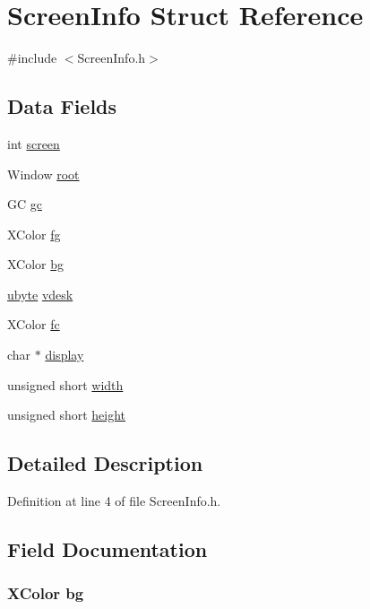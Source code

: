 \hypertarget{struct_screen_info}{
\section{ScreenInfo Struct Reference}
\label{struct_screen_info}
}


{\ttfamily \#include $<$ScreenInfo.h$>$}

\subsection*{Data Fields}
\begin{DoxyCompactItemize}
\item 
int \hyperlink{struct_screen_info_a3109b0889cec9f0de874a2bdc1f84372}{screen}
\item 
Window \hyperlink{struct_screen_info_a67efd2aa4387dcb1b33df1f044512a16}{root}
\item 
GC \hyperlink{struct_screen_info_a5da9d24666f1955a9b5ce3d2583b823a}{gc}
\item 
XColor \hyperlink{struct_screen_info_aed0a28efb15ae5e30e0891b8af03b81f}{fg}
\item 
XColor \hyperlink{struct_screen_info_aed6074a680f9192c5fec0db4ba505bd4}{bg}
\item 
\hyperlink{arwm_8h_a5dd4f281954ce1405c92d62a427f839a}{ubyte} \hyperlink{struct_screen_info_ac261b53c2ef43b8fb701497822972797}{vdesk}
\item 
XColor \hyperlink{struct_screen_info_a1c33682701113f93a154f659078b1940}{fc}
\item 
char $\ast$ \hyperlink{struct_screen_info_ac49dfab9200d48f835ce64819c4fc878}{display}
\item 
unsigned short \hyperlink{struct_screen_info_a8a31e3e5c2765d45488c75c00bacfefd}{width}
\item 
unsigned short \hyperlink{struct_screen_info_aa8e4172ede7827e837ac528eae04c497}{height}
\end{DoxyCompactItemize}


\subsection{Detailed Description}


Definition at line 4 of file ScreenInfo.h.



\subsection{Field Documentation}
\hypertarget{struct_screen_info_aed6074a680f9192c5fec0db4ba505bd4}{
\subsubsection[{bg}]{\setlength{\rightskip}{0pt plus 5cm}XColor {\bf bg}}}
\label{struct_screen_info_aed6074a680f9192c5fec0db4ba505bd4}


